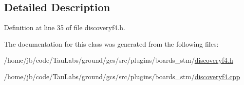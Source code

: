 \subsection{\-Detailed \-Description}


\-Definition at line 35 of file discoveryf4.\-h.



\-The documentation for this class was generated from the following files\-:\begin{DoxyCompactItemize}
\item 
/home/jb/code/\-Tau\-Labs/ground/gcs/src/plugins/boards\-\_\-stm/\hyperlink{discoveryf4_8h}{discoveryf4.\-h}\item 
/home/jb/code/\-Tau\-Labs/ground/gcs/src/plugins/boards\-\_\-stm/\hyperlink{discoveryf4_8cpp}{discoveryf4.\-cpp}\end{DoxyCompactItemize}
